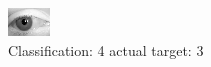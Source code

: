 \begin{figure}[h!]
\begin{center}
\includegraphics[width=0.60\columnwidth]{figures/ID2801_class_4_target_3.png}
\end{center}
\caption{ Classification: 4 actual target: 3}
\label{fig:ID2801_class_4_target_3}
\end{figure}
